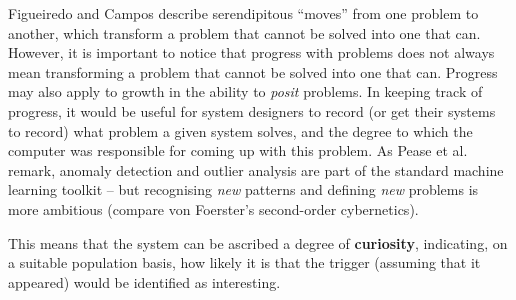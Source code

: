 Figueiredo and Campos \cite{Figueiredo2001} describe serendipitous
``moves'' from one problem to another, which transform a problem that
cannot be solved into one that can.  However, it is important to
notice that progress with problems does not always mean transforming a
problem that cannot be solved into one that can.  Progress may also
apply to growth in the ability to \emph{posit} problems.  In keeping
track of progress, it would be useful for system designers to record
(or get their systems to record) what problem a given system solves,
and the degree to which the computer was responsible for coming up
with this problem.
%
As Pease et al. \cite[p. 69]{pease2013discussion} remark,
anomaly detection and outlier analysis are part of the standard
machine learning toolkit -- but recognising \emph{new} patterns and
defining \emph{new} problems is more ambitious (compare von Foerster's
\cite{von2003cybernetics} second-order cybernetics). 




This means that the system can be ascribed a degree of
{\textbf{curiosity}}, indicating, on a suitable population basis, how
likely it is that the trigger (assuming that it appeared) would be
identified as interesting.


